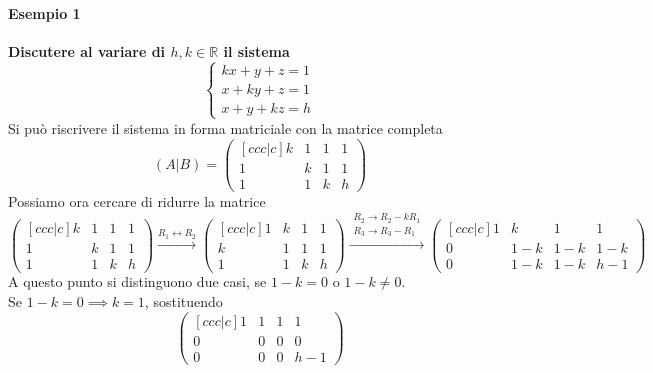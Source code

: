 \paragraph{Esempio 1}%
\textbf{Discutere al variare di $h,k\in\mathbb{R}$ il sistema}
\begin{equation*}
  \begin{cases}
    kx + y + z = 1\\
    x + ky + z = 1\\
    x + y + kz = h
  \end{cases}
\end{equation*}
Si può riscrivere il sistema in forma matriciale con la matrice completa
\begin{equation*}
  (A\vert B) =
    \begin{pmatrix}[ccc|c]
    k & 1 & 1 & 1\\
    1 & k & 1 & 1\\
    1 & 1 & k & h
    \end{pmatrix}
\end{equation*}
Possiamo ora cercare di ridurre la matrice
\begin{equation*}
    \begin{pmatrix}[ccc|c]
    k & 1 & 1 & 1\\
    1 & k & 1 & 1\\
    1 & 1 & k & h
    \end{pmatrix}
  \xrightarrow{R_1\leftrightarrow R_2}
    \begin{pmatrix}[ccc|c]
    1 & k & 1 & 1\\
    k & 1 & 1 & 1\\
    1 & 1 & k & h
    \end{pmatrix}
  \xrightarrow{\substack{R_2\to R_2-kR_1\\ R_3\to R_3-R_1}}
  \begin{pmatrix}[ccc|c]
    1 & k & 1 & 1\\
    0 & 1-k & 1-k & 1-k\\
    0 & 1-k & 1-k & h-1
    \end{pmatrix}
\end{equation*}
A questo punto si distinguono due casi, se $1-k = 0$ o $1-k\neq0$.\\
Se $1-k=0\implies k=1$, sostituendo
\begin{equation*}
    \begin{pmatrix}[ccc|c]
    1 & 1 & 1 & 1\\
    0 & 0 & 0 & 0\\
    0 & 0 & 0 & h-1
    \end{pmatrix}
\end{equation*}
